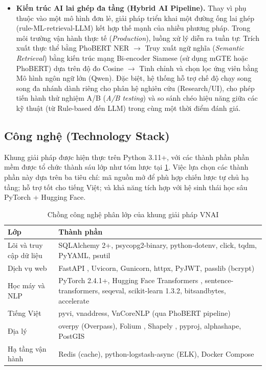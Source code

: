 \begin{itemize}[leftmargin=*]
\item \textbf{Kiến trúc AI lai ghép đa tầng (Hybrid AI Pipeline).} 
Thay vì phụ thuộc vào một mô hình đơn lẻ, giải pháp triển khai một đường ống lai ghép (rule-ML-retrieval-LLM) kết hợp thế mạnh của nhiều phương pháp. Trong môi trường vận hành thực tế (\textit{Production}), luồng xử lý diễn ra tuần tự: Trích xuất thực thể bằng PhoBERT NER $\to$ Truy xuất ngữ nghĩa (\textit{Semantic Retrieval}) bằng kiến trúc mạng Bi-encoder Siamese (sử dụng mGTE hoặc PhoBERT) dựa trên độ đo Cosine $\to$ Tinh chỉnh và chọn lọc ứng viên bằng Mô hình ngôn ngữ lớn (Qwen). Đặc biệt, hệ thống hỗ trợ chế độ chạy song song đa nhánh dành riêng cho phân hệ nghiên cứu (Research/UI), cho phép tiến hành thử nghiệm A/B (\textit{A/B testing}) và so sánh chéo hiệu năng giữa các kỹ thuật (từ Rule-based đến LLM) trong cùng một thời điểm đánh giá.
\end{itemize}

\subsection{Công nghệ (Technology Stack)}
\label{sec:tech-stack}

Khung giải pháp được hiện thực trên Python 3.11+, với các thành phần phần mềm được tổ chức thành sáu lớp như tóm lược tại \cref{tab:tech-stack}. Việc lựa chọn các thành phần này dựa trên ba tiêu chí: mã nguồn mở để phù hợp chiến lược tự chủ hạ tầng; hỗ trợ tốt cho tiếng Việt; và khả năng tích hợp với hệ sinh thái học sâu PyTorch + Hugging Face.

\begin{table}[H]
\centering
\caption{Chồng công nghệ phân lớp của khung giải pháp VNAI}
\label{tab:tech-stack}
\small
\begin{tabularx}{\linewidth}{>{\raggedright\arraybackslash}p{3.2cm} >{\raggedright\arraybackslash}X}
\toprule
\textbf{Lớp} & \textbf{Thành phần} \\
\midrule
Lõi và truy cập dữ liệu & SQLAlchemy 2+, psycopg2-binary, python-dotenv, click, tqdm, PyYAML, psutil \\
Dịch vụ web & FastAPI \cite{Tiangolo2024FastAPI}, Uvicorn, Gunicorn, httpx, PyJWT, passlib (bcrypt) \\
Học máy và NLP & PyTorch 2.4.1+, Hugging Face Transformers \cite{Wolf2020Transformers}, sentence-transformers, seqeval, scikit-learn 1.3.2, bitsandbytes, accelerate \\
Tiếng Việt & pyvi, vnaddress, VnCoreNLP (qua PhoBERT pipeline) \\
Địa lý & overpy (Overpass), Folium \cite{Folium2024}, Shapely \cite{Shapely2024}, pyproj, alphashape, PostGIS \cite{PostGIS2024} \\
Hạ tầng vận hành & Redis (cache), python-logstash-async (ELK), Docker Compose \\
\bottomrule
\end{tabularx}
\end{table}

